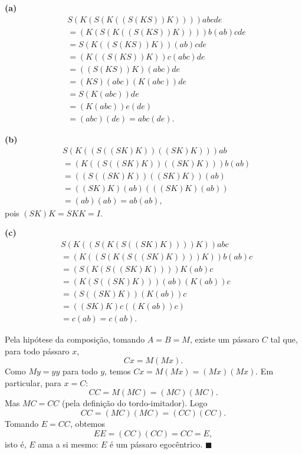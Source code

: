 \begin{solution}
\textbf{(a)}
\[
\begin{aligned}
&S(K(S(K((S(KS))K))))abcde \\
&= (K(S(K((S(KS))K))))b(ab)cde \\
&= S(K((S(KS))K))(ab)cde \\
&= (K((S(KS))K))c(abc)de \\
&= ((S(KS))K)(abc)de \\
&= (KS)(abc)(K(abc))de \\
&= S(K(abc))de \\
&= (K(abc))e(de) \\
&= (abc)(de) = abc(de).
\end{aligned}
\]

\textbf{(b)}
\[
\begin{aligned}
&S(K((S((SK)K))((SK)K)))ab \\
&= (K((S((SK)K))((SK)K)))b(ab) \\
&= ((S((SK)K))((SK)K))(ab) \\
&= ((SK)K)(ab)(((SK)K)(ab)) \\
&= (ab)(ab) = ab(ab),
\end{aligned}
\]
pois $(SK)K = SKK = I$.

\textbf{(c)}
\[
\begin{aligned}
&S(K((S(K(S((SK)K))))K))abc \\
&= (K((S(K(S((SK)K))))K))b(ab)c \\
&= (S(K(S((SK)K))))K(ab)c \\
&= (K(S((SK)K)))(ab)(K(ab))c \\
&= (S((SK)K))(K(ab))c \\
&= ((SK)K)c((K(ab))c) \\
&= c(ab) = c(ab).
\end{aligned}
\]
\end{solution}


\begin{solution}
Pela hipótese da composição, tomando $A = B = M$, existe um pássaro $C$ tal que, para todo pássaro $x$,
\[
    Cx = M(Mx).
\]
Como $My = yy$ para todo $y$, temos $Cx = M(Mx) = (Mx)(Mx)$. Em particular, para $x = C$:
\[
    CC = M(MC) = (MC)(MC).
\]
Mas $MC = CC$ (pela definição do tordo-imitador). Logo
\[
    CC = (MC)(MC) = (CC)(CC).
\]
Tomando $E = CC$, obtemos
\[
    EE = (CC)(CC) = CC = E,
\]
isto é, $E$ ama a si mesmo: $E$ é um pássaro egocêntrico. $\blacksquare$
\end{solution}


